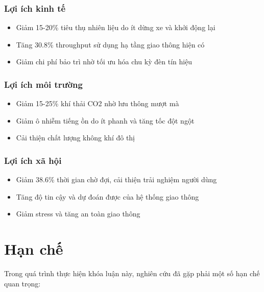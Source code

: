 \subsubsection{Lợi ích kinh tế}
\begin{itemize}
    \item Giảm 15-20\% tiêu thụ nhiên liệu do ít dừng xe và khởi động lại

    \item Tăng 30.8\% throughput sử dụng hạ tầng giao thông hiện có

    \item Giảm chi phí bảo trì nhờ tối ưu hóa chu kỳ đèn tín hiệu
\end{itemize}

\subsubsection{Lợi ích môi trường}
\begin{itemize}
    \item Giảm 15-25\% khí thải CO2 nhờ lưu thông mượt mà

    \item Giảm ô nhiễm tiếng ồn do ít phanh và tăng tốc đột ngột

    \item Cải thiện chất lượng không khí đô thị
\end{itemize}

\subsubsection{Lợi ích xã hội}
\begin{itemize}
    \item Giảm 38.6\% thời gian chờ đợi, cải thiện trải nghiệm người dùng

    \item Tăng độ tin cậy và dự đoán được của hệ thống giao thông

    \item Giảm stress và tăng an toàn giao thông
\end{itemize}

\section{Hạn chế}

Trong quá trình thực hiện khóa luận này, nghiên cứu đã gặp phải một số hạn chế
quan trọng:

